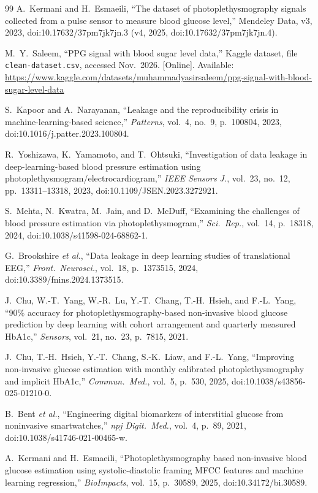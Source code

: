 \begin{thebibliography}{99}
A.~Kermani and H.~Esmaeili, ``The dataset of photoplethysmography signals
collected from a pulse sensor to measure blood glucose level,'' Mendeley
Data, v3, 2023, doi:10.17632/37pm7jk7jn.3 (v4, 2025, doi:10.17632/37pm7jk7jn.4).

M.~Y.~Saleem, ``PPG signal with blood sugar level data,'' Kaggle dataset,
file \texttt{clean-dataset.csv}, accessed Nov.\ 2026.
[Online]. Available: \url{https://www.kaggle.com/datasets/muhammadyasirsaleem/ppg-signal-with-blood-sugar-level-data}

S.~Kapoor and A.~Narayanan, ``Leakage and the reproducibility crisis in
machine-learning-based science,'' \emph{Patterns}, vol.~4, no.~9,
p.~100804, 2023, doi:10.1016/j.patter.2023.100804.

R.~Yoshizawa, K.~Yamamoto, and T.~Ohtsuki, ``Investigation of data leakage
in deep-learning-based blood pressure estimation using
photoplethysmogram/electrocardiogram,'' \emph{IEEE Sensors J.}, vol.~23,
no.~12, pp.~13311--13318, 2023, doi:10.1109/JSEN.2023.3272921.

S.~Mehta, N.~Kwatra, M.~Jain, and D.~McDuff, ``Examining the challenges of
blood pressure estimation via photoplethysmogram,'' \emph{Sci.\ Rep.},
vol.~14, p.~18318, 2024, doi:10.1038/s41598-024-68862-1.

G.~Brookshire \emph{et al.}, ``Data leakage in deep learning studies of
translational EEG,'' \emph{Front.\ Neurosci.}, vol.~18, p.~1373515, 2024,
doi:10.3389/fnins.2024.1373515.

J.~Chu, W.-T.~Yang, W.-R.~Lu, Y.-T.~Chang, T.-H.~Hsieh, and F.-L.~Yang,
``90\% accuracy for photoplethysmography-based
non-invasive blood glucose prediction by deep learning with cohort
arrangement and quarterly measured HbA1c,'' \emph{Sensors}, vol.~21, no.~23,
p.~7815, 2021.

J.~Chu, T.-H.~Hsieh, Y.-T.~Chang, S.-K.~Liaw, and F.-L.~Yang,
``Improving non-invasive glucose estimation with
monthly calibrated photoplethysmography and implicit HbA1c,''
\emph{Commun.\ Med.}, vol.~5, p.~530, 2025, doi:10.1038/s43856-025-01210-0.

B.~Bent \emph{et al.}, ``Engineering digital biomarkers of interstitial
glucose from noninvasive smartwatches,'' \emph{npj Digit.\ Med.}, vol.~4,
p.~89, 2021, doi:10.1038/s41746-021-00465-w.

A.~Kermani and H.~Esmaeili, ``Photoplethysmography based non-invasive blood
glucose estimation using systolic-diastolic framing MFCC features and
machine learning regression,'' \emph{BioImpacts}, vol.~15, p.~30589, 2025,
doi:10.34172/bi.30589.


\end{thebibliography}
